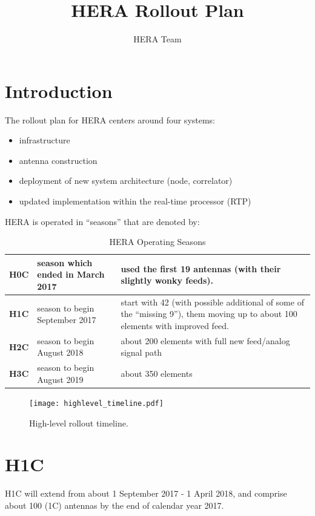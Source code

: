\documentclass{article}
\begin{document}
\author{HERA Team}
\title{HERA Rollout Plan}
\maketitle

\setcounter{section}{-1}
\section{Introduction}
The rollout plan for HERA centers around four systems:
\begin{itemize}
\item infrastructure
\item antenna construction
\item deployment of new system architecture (node, correlator)
\item updated implementation within the real-time processor (RTP)
\end{itemize}

HERA is operated in ``seasons'' that are denoted by:

\begin{table}[H]
\caption{HERA Operating Seasons}
\begin{tabular}{p{0.5in} p{2.2in} p{3.5in}} \hline
{\bf H0C} & season which ended in March 2017 & used the first 19 antennas (with their slightly wonky feeds). \\ \hline
{\bf H1C} & season to begin September 2017 & start with 42 (with possible additional of some of the ``missing 9''), them moving up to about 100 elements with improved feed.\\ \hline
{\bf H2C} & season to begin August 2018 & about 200 elements with full new feed/analog signal path\\ \hline
{\bf H3C} & season to begin August 2019 & about 350 elements \\ \hline
\end{tabular}
\end{table}

\begin{figure}
\texttt{[image: highlevel\_timeline.pdf]} %
\caption{High-level rollout timeline.}
\end{figure}

\section{H1C}
H1C will extend from about 1 September 2017 - 1 April 2018, and comprise about 100 (1C) antennas by the end of calendar year 2017.
\end{document}
